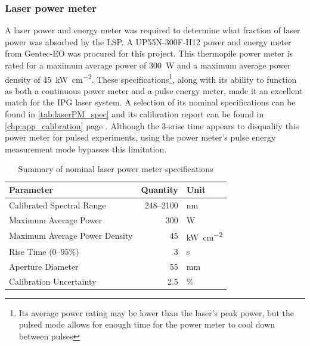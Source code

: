             \subsubsection*{Laser power meter}
                A laser power and energy meter was required to determine what fraction of laser power was absorbed by the LSP. A UP55N-300F-H12 power and energy meter from Gentec-EO was procured for this project. This thermopile power meter is rated for a maximum average power of 300~W and a maximum average power density of \qty{45}{kW.cm^{-2}}. These specifications\footnote{Its average power rating may be lower than the laser's peak power, but the pulsed mode allows for enough time for the power meter to cool down between pulses}, along with its ability to function as both a continuous power meter and a pulse energy meter, made it an excellent match for the IPG laser system. A selection of its nominal specifications can be found in \autoref{tab:laserPM_spec} and its calibration report can be found in \autoref{chp:app_calibration} page \pageref*{ds:laserPM}. Although the \num{3}-\unit{s}rise time appears to disqualify this power meter for pulsed experiments, using the power meter's pulse energy measurement mode bypasses this limitation. 

                \begin{table}[h]
                    \centering
                    \caption{Summary of nominal laser power meter specifications}
                    \label{tab:laserPM_spec}
                    \begin{tabular}{@{}lrl@{}}
                        \toprule
                        Parameter            & Quantity & Unit \\ \midrule
                        Calibrated Spectral Range     & 248--2100         & nm            \\
                        Maximum Average Power         & 300               & W             \\
                        Maximum Average Power Density & 45                & \unit{kW.cm^{-2}}             \\
                        Rise Time (0--95\%)          & 3                 & s            \\
                        Aperture Diameter             & 55                & mm           \\ 
                        Calibration Uncertainty       & 2.5               & \% \\
                        \bottomrule
                        \end{tabular}
                \end{table}

